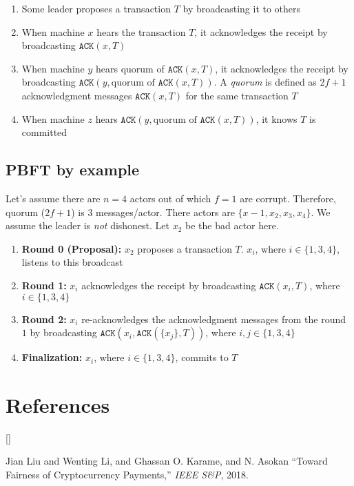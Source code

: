 \documentclass[twoside]{article}
\def\beginrefs{\begin{list}%
        {[\arabic{equation}]}{\usecounter{equation}
         \setlength{\leftmargin}{2.0truecm}\setlength{\labelsep}{0.4truecm}%
         \setlength{\labelwidth}{1.6truecm}}}
\def\endrefs{\end{list}}
\def\bibentry#1{\item[\hbox{[#1]}]}
\begin{document}
\begin{enumerate}
	\item Some leader proposes a transaction $T$ by broadcasting it to others
	\item When machine $x$ hears the transaction $T$, it acknowledges the receipt by broadcasting $\texttt{ACK}(x, T)$
	\item When machine $y$ hears quorum of $\texttt{ACK}(x, T)$, it acknowledges the receipt by broadcasting $\texttt{ACK}(y, \text{quorum of } \texttt{ACK}(x, T))$.
	A \textit{quorum} is defined as $2f + 1$ acknowledgment messages $\texttt{ACK}(x, T)$ for the same transaction $T$
	\item When machine $z$ hears $\texttt{ACK}(y, \text{quorum of } \texttt{ACK}(x, T))$, it knows $T$ is committed
\end{enumerate}


\subsection{PBFT by example}
Let's assume there are $n=4$ actors out of which $f=1$ are corrupt.
Therefore, quorum ($2f + 1$) is $3$ messages/actor.
There actors are $\{x-1, x_2, x_3, x_4\}$.
We assume the leader is \textit{not} dishonest.
Let $x_2$ be the bad actor here.

\begin{enumerate}
	\item \textbf{Round 0 (Proposal): } $x_2$ proposes a transaction $T$.
	$x_i$, where $i \in \{1, 3, 4\}$, listens to this broadcast
	\item \textbf{Round 1: } $x_i$ acknowledges the receipt by broadcasting $\texttt{ACK}(x_i, T)$, where $i \in \{1, 3, 4\}$
	\item \textbf{Round 2: } $x_i$ re-acknowledges the acknowledgment messages from the round $1$ by broadcasting $\texttt{ACK}(x_i, \texttt{ACK}(\{x_j\}, T))$, where $i, j \in \{1, 3, 4\}$
	\item \textbf{Finalization:} $x_i$, where $i \in \{1, 3, 4\}$, commits to $T$
\end{enumerate}

\section*{References}
\beginrefs
\bibentry{1}{\sc Jian Liu} and {\sc Wenting Li}, and {\sc Ghassan O. Karame}, and {\sc N. Asokan}
``Toward Fairness of Cryptocurrency Payments,''
{\it IEEE S\&P},
2018.
\endrefs

\end{document}
